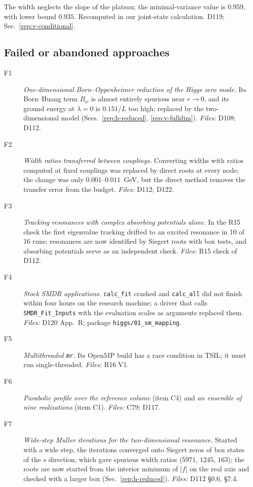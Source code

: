 \begin{description}
{The width neglects the slope of the plateau; the minimal-variance value is $0.959$, with lower bound $0.935$.}
{Recomputed in our joint-state calculation.}
{D119; Sec.~\ref{rep:v-conditional}.}
\end{description}

\subsection{Failed or abandoned approaches}\label{sec:v23-failed}

\begin{description}
\item[F1] \emph{One-dimensional Born--Oppenheimer reduction of the Higgs zero mode.} Its Born--Huang term $B_w$ is almost entirely spurious near $r\to0$, and its ground energy at $\lambda=0$ is $0.151/L$ too high; replaced by the two-dimensional model (Secs.~\ref{rep:h-reduced}, \ref{rep:v-fulldim}). \emph{Files:} {\small D108; D112.}
\item[F2] \emph{Width ratios transferred between couplings.} Converting widths with ratios computed at fixed couplings was replaced by direct roots at every node; the change was only $0.001$--$0.011$~GeV, but the direct method removes the transfer error from the budget. \emph{Files:} {\small D112; D122.}
\item[F3] \emph{Tracking resonances with complex absorbing potentials alone.} In the R15 check the first eigenvalue tracking drifted to an excited resonance in 10 of 16 runs; resonances are now identified by Siegert roots with box tests, and absorbing potentials serve as an independent check. \emph{Files:} {\small R15 check of D112.}
\item[F4] \emph{Stock SMDR applications.} \texttt{calc\_fit} crashed and \texttt{calc\_all} did not finish within four hours on the research machine; a driver that calls \texttt{SMDR\_Fit\_Inputs} with the evaluation scales as arguments replaced them. \emph{Files:} {\small D120 App.~R; package \texttt{higgs/01\_sm\_mapping}.}
\item[F5] \emph{Multithreaded \texttt{mr}.} Its OpenMP build has a race condition in TSIL; it must run single-threaded. \emph{Files:} {\small R16 V1.}
\item[F6] \emph{Parabolic profile over the reference volume} (item C4) and \emph{an ensemble of nine realizations} (item C1). \emph{Files:} {\small C79; D117.}
\item[F7] \emph{Wide-step Muller iterations for the two-dimensional resonance.} Started with a wide step, the iterations converged onto Siegert zeros of box states of the $s$ direction, which gave spurious width ratios ($5971$, $1245$, $163$); the roots are now started from the interior minimum of $|f|$ on the real axis and checked with a larger box (Sec.~\ref{rep:h-reduced}). \emph{Files:} {\small D112 \S0.6, \S7.4.}

\end{description}
